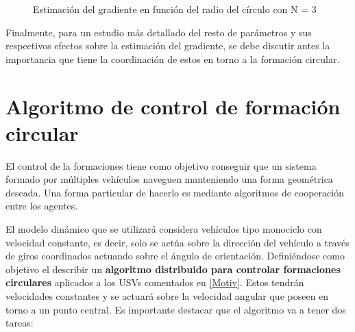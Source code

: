 \begin{figure}[htb]
  \begin{center}
    \caption{Estimación del gradiente en función del radio del círculo con N = 3}
    \label{VARD}
  \end{center}
\end{figure}

Finalmente, para un estudio más detallado del resto de parámetros y sus respectivos efectos sobre la estimación del gradiente, se debe discutir antes la importancia que tiene la coordinación de estos en torno a la formación circular.

\section{Algoritmo de control de formación circular}

El control de la formaciones tiene como objetivo conseguir que un sistema formado por múltiples vehículos naveguen manteniendo una forma geométrica deseada. Una forma particular de hacerlo es mediante algoritmos de cooperación entre los agentes.

El modelo dinámico que se utilizará considera vehículos tipo monociclo con velocidad constante, es decir, solo se actúa sobre la dirección del vehículo a través de giros coordinados actuando sobre el ángulo de orientación. Definiéndose como objetivo el describir un \textbf{algoritmo distribuido para controlar formaciones circulares} aplicados a los USVs comentados en \ref{Motiv}. Estos tendrán velocidades constantes y se actuará sobre la velocidad angular que poseen en torno a un punto central. 
\newpage
Es importante destacar que el algoritmo va a tener dos tareas:

